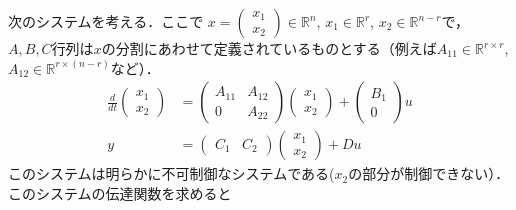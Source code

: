 次のシステムを考える．ここで
$x = \left(\begin{array}{c} {x}_1 \\ {x}_2 \end{array}\right) \in {\mathbb R}^n$, 
$x_1 \in {\mathbb R}^r$, $x_2 \in {\mathbb R}^{n-r}$で，$A,B,C$行列は$x$の分割にあわせて定義されているものとする（例えば$A_{11} \in {\mathbb R}^{r \times r}$, $A_{12} \in {\mathbb R}^{r \times (n-r)}$など）．
\begin{align}
 \frac{d}{dt}
  \left(\begin{array}{c}
         {x}_1 \\
	 {x}_2 
	\end{array}\right)
  &=
  \left(\begin{array}{cc}
         {A}_{11} & {A}_{12} \\
	     0        & {A}_{22}
	\end{array}\right)
  \left(\begin{array}{c}
         {x}_1 \\
	 {x}_2 
	\end{array}\right)
  +
  \left(\begin{array}{c}
         {B}_1 \\
	 0
	\end{array}\right)
  u \\
 y &=
  \left(\begin{array}{cc}
         {C}_1 & {C}_2 
	\end{array}\right)
  \left(\begin{array}{c}
         {x}_1 \\
	 {x}_2 
	\end{array}\right)
  + D u
\end{align}
このシステムは明らかに不可制御なシステムである($x_2$の部分が制御できない）．このシステムの伝達関数を求めると
